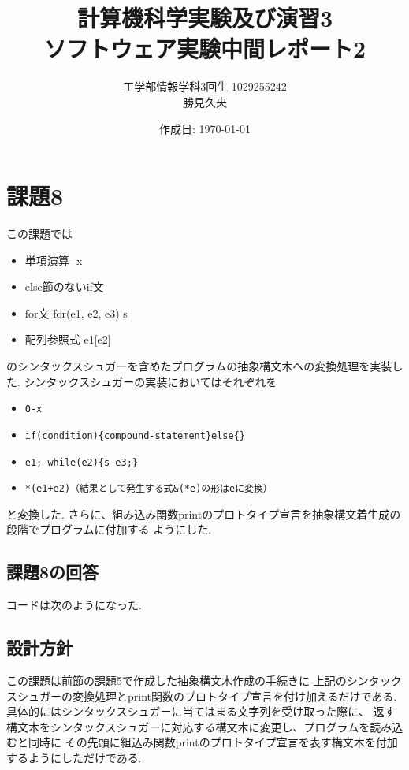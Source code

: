 \documentclass[a4j,dvipdfmx]{jarticle}
\begin{document}
\title{計算機科学実験及び演習3\\ソフトウェア実験中間レポート2}
\author{工学部情報学科3回生 1029255242\\勝見久央}
\date{作成日: \today} %
\maketitle
\section{課題8}
この課題では
\begin{itemize}
\item 単項演算 -x
\item else節のないif文 
\item for文 for(e1, e2, e3) s
\item 配列参照式 e1[e2]
\end{itemize}
のシンタックスシュガーを含めたプログラムの抽象構文木への変換処理を実装した.
シンタックスシュガーの実装においてはそれぞれを
\begin{itemize}
\item \begin{verbatim}0-x\end{verbatim}
\item \begin{verbatim}if(condition){compound-statement}else{}\end{verbatim}
\item \begin{verbatim}e1; while(e2){s e3;}\end{verbatim}
\item \begin{verbatim}*(e1+e2)（結果として発生する式&(*e)の形はeに変換）\end{verbatim}
\end{itemize}
と変換した.
さらに、組み込み関数printのプロトタイプ宣言を抽象構文着生成の段階でプログラムに付加する
ようにした.
\subsection{課題8の回答}
コードは次のようになった.

\subsection{設計方針}
この課題は前節の課題5で作成した抽象構文木作成の手続きに
上記のシンタックスシュガーの変換処理とprint関数のプロトタイプ宣言を付け加えるだけである.
具体的にはシンタックスシュガーに当てはまる文字列を受け取った際に、
返す構文木をシンタックスシュガーに対応する構文木に変更し、プログラムを読み込むと同時に
その先頭に組込み関数printのプロトタイプ宣言を表す構文木を付加するようにしただけである.
\end{document}
